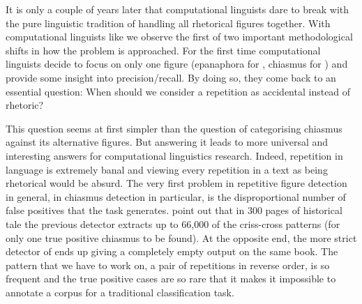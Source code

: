 \documentclass[11pt]{article}
\begin{document}
It is only a couple of years later that computational linguists dare to break with the pure linguistic tradition of handling all rhetorical figures together. With computational linguists like  we observe the first of two important methodological shifts in how the problem is approached. For the first time computational linguists decide to focus on only one figure (epanaphora for , chiasmus for ) and provide some insight into precision/recall. By doing so, they come back to an essential question: When should we consider a repetition as accidental instead of rhetoric? 

This question seems at first simpler than the question of categorising chiasmus against its alternative figures. But answering it leads to more universal and interesting answers for computational linguistics research. Indeed, repetition in language is extremely banal and viewing every repetition in a text as being rhetorical would be absurd. The very first problem in repetitive figure detection in general, in chiasmus detection in particular, is the disproportional number of false positives that the task generates.  point out that in 300 pages of historical tale the previous detector \cite{gawr} extracts up to 66,000 of the criss-cross patterns (for only one true positive chiasmus to be found). At the opposite end, the more strict detector of  ends up giving a completely empty output on the same book.
The pattern that we have to work on, a pair of repetitions in reverse order, is so frequent and the true positive cases are so rare that it makes it impossible to annotate a corpus for a traditional classification task. 
\end{document}
